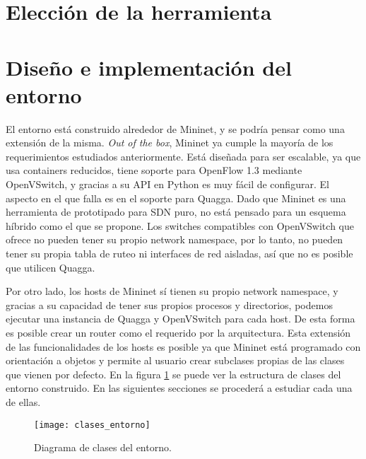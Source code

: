 \section{Elección de la herramienta}


\section{Diseño e implementación del entorno}
El entorno está construido alrededor de Mininet, y se podría pensar como una extensión de la misma. \textit{Out of the box}, Mininet ya cumple la mayoría de los requerimientos estudiados anteriormente. Está diseñada para ser escalable, ya que usa containers reducidos, tiene soporte para OpenFlow 1.3 mediante OpenVSwitch, y gracias a su API en Python es muy fácil de configurar. El aspecto en el que falla es en el soporte para Quagga. Dado que Mininet es una herramienta de prototipado para SDN puro, no está pensado para un esquema híbrido como el que se propone. Los switches compatibles con OpenVSwitch que ofrece no pueden tener su propio network namespace, por lo tanto, no pueden tener su propia tabla de ruteo ni interfaces de red aisladas, así que no es posible que utilicen Quagga.

Por otro lado, los hosts de Mininet sí tienen su propio network namespace, y gracias a su capacidad de tener sus propios procesos y directorios, podemos ejecutar una instancia de Quagga y OpenVSwitch para cada host. De esta forma es posible crear un router como el requerido por la arquitectura. Esta extensión de las funcionalidades de los hosts es posible ya que Mininet está programado con orientación a objetos y permite al usuario crear subclases propias de las clases que vienen por defecto. En la figura \ref{fig:clases_entorno} se puede ver la estructura de clases del entorno construido. En las siguientes secciones se procederá a estudiar cada una de ellas.

\begin{figure}[t]
	\caption{Diagrama de clases del entorno.}
	\texttt{[image: clases\_entorno]}
	\centering
	\label{fig:clases_entorno}
\end{figure}

